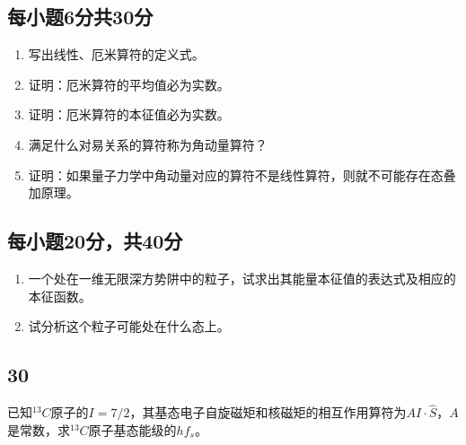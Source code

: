 

\subsection{每小题6分共30分}

\begin{enumerate}
        \item 写出线性、厄米算符的定义式。
        \item 证明：厄米算符的平均值必为实数。
        \item 证明：厄米算符的本征值必为实数。
        \item 满足什么对易关系的算符称为角动量算符？
        \item 证明：如果量子力学中角动量对应的算符不是线性算符，则就不可能存在态叠加原理。
    \end{enumerate}
 \subsection{每小题20分，共40分} 
    \begin{enumerate}
        \item 一个处在一维无限深方势阱中的粒子，试求出其能量本征值的表达式及相应的本征函数。
        \item 试分析这个粒子可能处在什么态上。
    \end{enumerate}
  \subsection{30}
    已知$^{13}C$原子的$I=7/2$，其基态电子自旋磁矩和核磁矩的相互作用算符为$A\hat{I}\cdot\hat{S}$，$A$是常数，求$^{13}C$原子基态能级的$hf_s$。
  